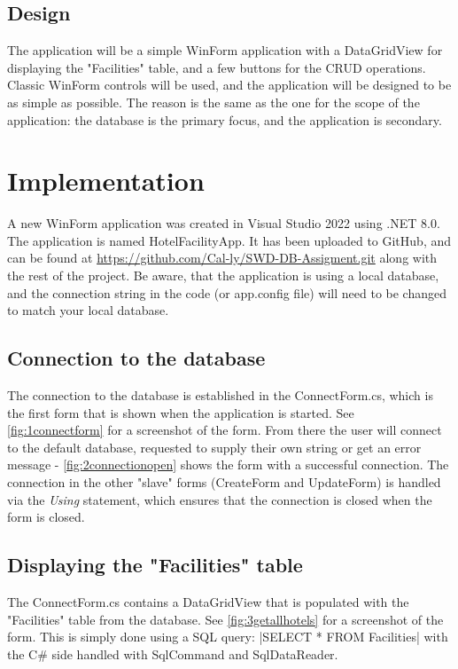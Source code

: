 \subsection{Design}
The application will be a simple WinForm application with a DataGridView for displaying the "Facilities" table, and a few buttons for the CRUD operations.
Classic WinForm controls will be used, and the application will be designed to be as simple as possible. 
The reason is the same as the one for the scope of the application: the database is the primary focus, and the application is secondary.

\section{Implementation}
A new WinForm application was created in Visual Studio 2022 using .NET 8.0. The application is named HotelFacilityApp. 
It has been uploaded to GitHub, and can be found at \url{https://github.com/Cal-ly/SWD-DB-Assigment.git} along with the rest of the project.
Be aware, that the application is using a local database, and the connection string in the code (or app.config file) 
will need to be changed to match your local database.

\subsection{Connection to the database}
The connection to the database is established in the ConnectForm.cs, which is the first form that is shown when the application is started.
See \ref*{fig:1connectform} for a screenshot of the form. From there the user will connect to the default database, 
requested to supply their own string or get an error message - \ref*{fig:2connectionopen} shows the form with a successful connection.
The connection in the other "slave" forms (CreateForm and UpdateForm) is handled via the \emph{Using} statement, 
which ensures that the connection is closed when the form is closed.

\subsection{Displaying the "Facilities" table}
The ConnectForm.cs contains a DataGridView that is populated with the "Facilities" table from the database.
See \ref*{fig:3getallhotels} for a screenshot of the form. This is simply done using a SQL query:
|SELECT * FROM Facilities| 
with the C\# side handled with SqlCommand and SqlDataReader.

